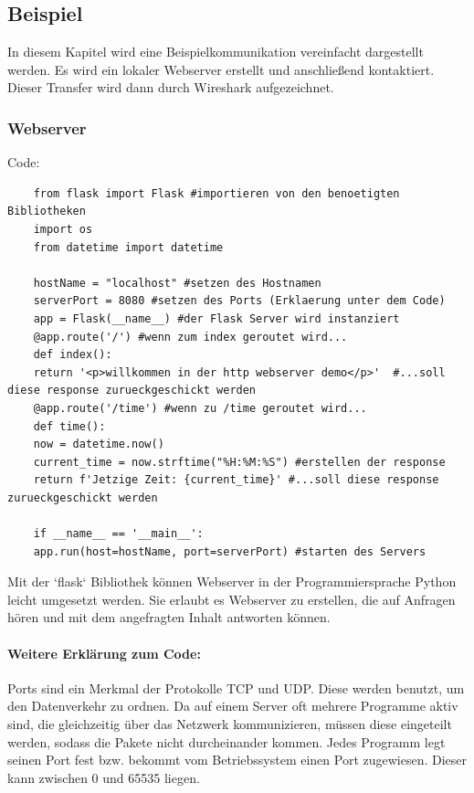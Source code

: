 \documentclass[12pt]{article}
\begin{document}
\subsection{Beispiel}
In diesem Kapitel wird eine Beispielkommunikation vereinfacht dargestellt werden. Es wird ein lokaler Webserver erstellt und anschließend kontaktiert. Dieser Transfer wird dann durch Wireshark aufgezeichnet.

\subsubsection{Webserver}
Code: 

\begin{lstlisting}
	from flask import Flask #importieren von den benoetigten Bibliotheken
	import os
	from datetime import datetime
	
	hostName = "localhost" #setzen des Hostnamen
	serverPort = 8080 #setzen des Ports (Erklaerung unter dem Code)
	app = Flask(__name__) #der Flask Server wird instanziert
	@app.route('/') #wenn zum index geroutet wird...
	def index():
	return '<p>willkommen in der http webserver demo</p>'  #...soll diese response zurueckgeschickt werden
	@app.route('/time') #wenn zu /time geroutet wird...
	def time():
	now = datetime.now()
	current_time = now.strftime("%H:%M:%S") #erstellen der response
	return f'Jetzige Zeit: {current_time}' #...soll diese response zurueckgeschickt werden
	
	if __name__ == '__main__':
	app.run(host=hostName, port=serverPort) #starten des Servers
\end{lstlisting}

Mit der `flask` Bibliothek können Webserver in der Programmiersprache Python leicht umgesetzt werden. Sie erlaubt es Webserver zu erstellen, die auf Anfragen hören und mit dem angefragten Inhalt antworten können.\cite{flask}

\paragraph{Weitere Erklärung zum Code:}
\glqq Ports sind ein Merkmal der Protokolle TCP und UDP\grqq\cite{ports19}. Diese werden benutzt, um den Datenverkehr zu ordnen. Da auf einem Server oft mehrere Programme aktiv sind, die gleichzeitig über das Netzwerk kommunizieren, müssen diese eingeteilt werden, sodass die Pakete nicht durcheinander kommen. Jedes Programm legt seinen Port fest bzw. bekommt vom Betriebssystem einen Port zugewiesen. Dieser kann zwischen 0 und 65535 liegen.\cite{ports}
\end{document}
